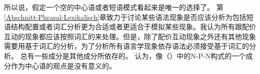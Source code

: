 所以说，假定一个空的中心语或者短语模式看起来是唯一的选择了。
%
第\ref{Abschnitt-Phrasal-Lexikalisch}章致力于讨论某些语法现象是否应该分析为包括短语结构配置或者词汇分析更为合适或者更适合于模拟某些现象。我认为所有跟配价互动的现象都应该按照词汇的来处理。但是，除了配价互动现象之外还有其他现象需要用基于词汇的分析，为了分析所有语言学现象依存语法必须接受基于词汇的分析。
总有一些成分是其他成分所依存的。 \citet{Jackendoff2008a}认为，像（）中的N-P-N构式的一个成分作为中心语的观点是没有意义的。
